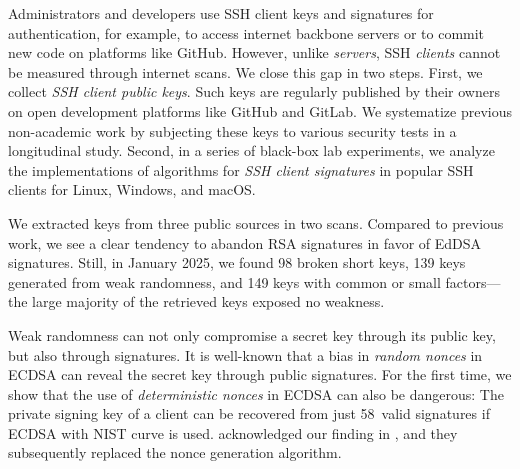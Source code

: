 Administrators and developers use SSH client keys and signatures for authentication, for example, to access internet backbone servers or to commit new code on platforms like GitHub. However, unlike \emph{servers}, SSH \emph{clients} cannot be measured through internet scans. We close this gap in two steps. First, we collect \emph{SSH client public keys}. Such keys are regularly published by their owners on open development platforms like GitHub and GitLab. We systematize previous non-academic work by subjecting these keys to various security tests in a longitudinal study. Second, in a series of black-box lab experiments, we analyze the implementations of algorithms for \emph{SSH client signatures} in \nrClients popular SSH clients for Linux, Windows, and macOS.

We extracted \totalKeys keys from three public sources in two scans. Compared to previous work, we see a clear tendency to abandon RSA signatures in favor of EdDSA signatures. Still, in January 2025, we found 98 broken short keys, 139 keys generated from weak randomness, and 149 keys with common or small factors---the large majority of the retrieved keys exposed no weakness.

Weak randomness can not only compromise a secret key through its public key, but also through signatures. It is well-known that a bias in \emph{random nonces} in ECDSA can reveal the secret key through public signatures. For the first time, we show that the use of \emph{deterministic nonces} in ECDSA can also be dangerous: The private signing key of a \putty client can be recovered from just 58~valid signatures if ECDSA with NIST curve \pfivetwoone is used. \putty acknowledged our finding in \puttycve, and they subsequently replaced the nonce generation algorithm.
